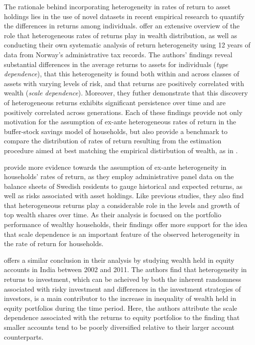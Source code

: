 \par The rationale behind incorporating heterogeneity in rates of return to asset holdings lies in the use of novel datasets in recent empirical research to quantify the differences in returns among individuals. \cite{aflgdmlp20} offer an extensive overview of the role that heterogeneous rates of returns play in wealth distribution, as well as conducting their own systematic analysis of return heterogeneity using 12 years of data from Norway's administrative tax records. The authors' findings reveal substantial differences in the average returns to assets for individuals (\textit{type dependence}), that this heterogeneity is found both within and across classes of assets with varying levels of risk, and that returns are positively correlated with wealth  (\textit{scale dependence}). Moreover, they futher demonstrate that this discovery of heterogeneous returns exhibits significant persistence over time and are positively correlated across generations. Each of these findings provide not only motivation for the assumption of ex-ante heterogeneous rates of return in the buffer-stock savings model of households, but also provide a benchmark to compare the distribution of rates of return resulting from the estimation procedure aimed at best matching the empirical distirbution of wealth, as in \cite{cstw2017}. 

\par \cite{lblcps18} provide more evidence towards the assumption of ex-ante heterogeneity in households' rates of return, as they employ administrative panel data on the balance sheets of Swedish residents to gauge historical and expected returns, as well as risks associated with asset holdings. Like previous studies, they also find that heterogeneous returns play a considerable role in the levels and growth of top wealth shares over time. As their analysis is focused on the portfolio performance of wealthy households, their findings offer more support for the idea that scale dependence is an important feature of the observed heterogeneity in the rate of return for households.

\par \cite{Campbell2019} offers a similar conclusion in their analysis by studying wealth held in equity accounts in India between 2002 and 2011. The authors find that heterogeneity in returns to investment, which can be acheived by both the inherent randomness associated with risky investment and differences in the investment strategies of investors, is a main contributor to the increase in inequality of wealth held in equity portfolios during the time period. Here, the authors attribute the scale dependence associated with the returns to equity portfolios to the finding that smaller accounts tend to be poorly diversified relative to their larger account counterparts. 

